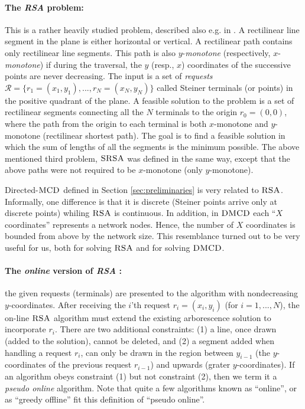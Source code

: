 \documentclass[11pt]{article}
\newcommand{\MCD}{\mbox{\sc MCD}}
\newcommand{\DMCD}{\mbox{\sc DMCD}}
\newcommand{\SRSA}{\mbox{\sc SRSA}}
\newcommand{\RSA}{\mbox{\sc RSA}}
\newcommand{\calR}{\mathcal{R}}
\begin{document}
\paragraph*{The {\em RSA} problem:}
This is a rather heavily studied problem, described also e.g. in \cite{ptas1,shor-rsa,berman,natansky,presented-rsa}.
A rectilinear line segment in the plane is either horizontal or vertical.
A rectilinear path contains only rectilinear line segments.
This path is also $y$-{\em monotone} (respectively, $x$-{\em monotone}) if during the traversal, the $y$ (resp., $x$) coordinates of the successive points
are never decreasing.
The input is a set of {\em requests}
$\calR=\{r_1=(x_1,y_1),...,r_N=(x_N,y_N)\}$
called Steiner terminals (or points) in the positive quadrant of the plane.
A feasible solution  to the problem is a set of rectilinear segments connecting all the $N$ terminals to the origin $r_0=(0,0)$,
where the path from the origin to each
terminal is both $x$-monotone and $y$-monotone (rectilinear shortest path).
The goal is to find a feasible solution in which the sum of lengths of all the segments is the minimum possible.
The above mentioned third problem, $\SRSA$
was defined in the same way, except that the above paths were not required to be $x$-monotone (only $y$-monotone).

Directed-$\MCD$ defined in Section \ref{sec:preliminaries} is very related to $\RSA$.
Informally, one difference is that it is discrete (Steiner points arrive only at discrete points) whiling $\RSA$ is continuous.
In addition, in $\DMCD$ each ``$X$ coordinates''  represents a network nodes.
Hence, the number of $X$ coordinates is bounded from above by the network size.
This resemblance turned out to be very useful for us, both for solving $\RSA$ and for solving $\DMCD$.


\paragraph*{The {\em online} version of {\em RSA} \cite{berman}:}
the given requests (terminals) are presented to the algorithm with nondecreasing
$y$-coordinates.
After receiving the $i$'th request $r_i=(x_i,y_i)$ (for $i=1,...,N$),
the on-line $\RSA$ algorithm must extend the existing arborescence solution to incorporate $r_i$.
There are two additional constraints:
(1) a line, once drawn (added to the solution), cannot be deleted,
and
(2) a segment added when handling a request $r_i$, can
only be drawn in the region between $y_{i-1}$ (the $y$-coordinates of the previous request $r_{i-1}$) and upwards
(grater $y$-coordinates).
If an algorithm obeys constraint (1) but not constraint (2), then we term it a {\em pseudo online} algorithm.
Note that quite a few algorithms known as ``online'', or as ``greedy offline'' fit this definition of ``pseudo online''.
\end{document}
